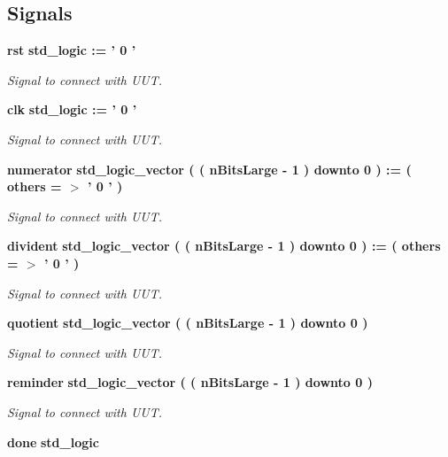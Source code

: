 \subsection*{Signals}
 \begin{DoxyCompactItemize}
\item 
{\bf rst} {\bfseries std\-\_\-logic  \-:= '  0  ' } \label{classtest_divisor_1_1behavior_a513fa2f18065f5d31a856b5a7268e6be}

\begin{DoxyCompactList}\small\item\em Signal to connect with U\-U\-T. \end{DoxyCompactList}\item 
{\bf clk} {\bfseries std\-\_\-logic  \-:= '  0  ' } \label{classtest_divisor_1_1behavior_ad8d4742a7eb2e3d3a95e8c0c37d14ed2}

\begin{DoxyCompactList}\small\item\em Signal to connect with U\-U\-T. \end{DoxyCompactList}\item 
{\bf numerator} {\bfseries std\-\_\-logic\-\_\-vector (  ( n\-Bits\-Large -\/   1  )    downto    0  )  \-:= (  others  = $>$ '  0  '  ) } \label{classtest_divisor_1_1behavior_ab6d0f470182dc53c3c65afad4c78bddd}

\begin{DoxyCompactList}\small\item\em Signal to connect with U\-U\-T. \end{DoxyCompactList}\item 
{\bf divident} {\bfseries std\-\_\-logic\-\_\-vector (  ( n\-Bits\-Large -\/   1  )    downto    0  )  \-:= (  others  = $>$ '  0  '  ) } \label{classtest_divisor_1_1behavior_a45d3fd79b3d4a9c68e45d5bfd00d1fc7}

\begin{DoxyCompactList}\small\item\em Signal to connect with U\-U\-T. \end{DoxyCompactList}\item 
{\bf quotient} {\bfseries std\-\_\-logic\-\_\-vector (  ( n\-Bits\-Large -\/   1  )    downto    0  ) } \label{classtest_divisor_1_1behavior_a0a9f54386a9ef858f70c32ccceb1ab0e}

\begin{DoxyCompactList}\small\item\em Signal to connect with U\-U\-T. \end{DoxyCompactList}\item 
{\bf reminder} {\bfseries std\-\_\-logic\-\_\-vector (  ( n\-Bits\-Large -\/   1  )    downto    0  ) } \label{classtest_divisor_1_1behavior_a4192e4decb5e0fff313ed7578a1fe6a5}

\begin{DoxyCompactList}\small\item\em Signal to connect with U\-U\-T. \end{DoxyCompactList}\item 
{\bf done} {\bfseries std\-\_\-logic } \label{classtest_divisor_1_1behavior_a52b926bb7d7b6f608cf22d09d17be95a}

\end{DoxyCompactItemize}
